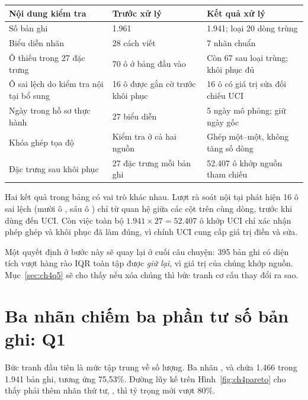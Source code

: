 \begin{center}\begin{minipage}{\linewidth}
\label{tab:ch4chatluong}
\small{}
\begin{tabularx}{\linewidth}{@{}Y p{3.1cm}p{3.1cm}@{}}
\toprule
Nội dung kiểm tra & Trước xử lý & Kết quả xử lý \\
\midrule
Số bản ghi & 1.961 & 1.941; loại 20 dòng trùng \\
Biểu diễn nhãn & 28 cách viết & 7 nhãn chuẩn \\
Ô thiếu trong 27 đặc trưng & 70 ô ở bảng đầu vào & Còn 67 sau loại trùng; khôi phục đủ \\
Ô sai lệch do kiểm tra nội tại bổ sung & 16 ô được gắn cờ trước khôi phục & 16 ô có giá trị sửa đối chiếu UCI \\
Ngày trong hồ sơ thực hành & 27 biểu diễn & 5 ngày mô phỏng; giữ ngày gốc \\
Khóa ghép tọa độ & Kiểm tra ở cả hai nguồn & Ghép một--một, không tăng số dòng \\
Đặc trưng sau khôi phục & 27 đặc trưng mỗi bản ghi & 52.407 ô khớp nguồn tham chiếu \\
\bottomrule
\end{tabularx}
\end{minipage}\end{center}

Hai kết quả trong bảng có vai trò khác nhau. Lượt rà soát nội tại phát hiện 16 ô sai lệch (mười ô , sáu ô ) chỉ từ quan hệ giữa các cột trên cùng dòng, trước khi dùng đến UCI. Còn việc toàn bộ $1.941\times27=52.407$ ô khớp UCI chỉ xác nhận phép ghép và khôi phục đã làm đúng, vì chính UCI cung cấp giá trị điền và sửa.

Một quyết định ở bước này sẽ quay lại ở cuối câu chuyện: 395 bản ghi có diện tích vượt hàng rào IQR toàn tập được \emph{giữ lại}, vì giá trị của chúng khớp nguồn. Mục~\ref{sec:ch4q5} sẽ cho thấy nếu xóa chúng thì bức tranh cơ cấu thay đổi ra sao.

\section{Ba nhãn chiếm ba phần tư số bản ghi: Q1}
\label{sec:ch4q1}

Bức tranh đầu tiên là mức tập trung về số lượng. Ba nhãn ,  và  chứa 1.466 trong 1.941 bản ghi, tương ứng 75,53\%. Đường lũy kế trên Hình~\ref{fig:ch4pareto} cho thấy phải thêm nhãn thứ tư, , thì tỷ trọng mới vượt 80\%.

